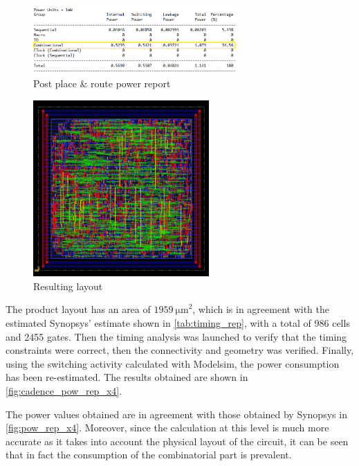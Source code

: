 \begin{figure}[htb]
	\center
	\includegraphics[width=0.7\textwidth]{images/rep_power_x4_cadence_mod.png}
	\caption{Post place \& route power report}
	\label{fig:cadence_pow_rep_x4}
\end{figure}

\begin{figure}[htb]
	\center
	\includegraphics[width=0.6\textwidth]{images/IIR_filter_period_min_x4_place.jpg}
	\caption{Resulting layout}
	\label{fig:layout}
\end{figure}

The product layout has an area of $\SI{1959}{\micro\meter}^2$, which is in agreement with the estimated Synopsys' estimate shown in \autoref{tab:timing_rep}, with a total of 986 cells and 2455 gates. Then the timing analysis was launched to verify that the timing constraints were correct, then the connectivity and geometry was verified. Finally, using the switching activity calculated with Modelsim, the power consumption has been re-estimated. The results obtained are shown in \autoref{fig:cadence_pow_rep_x4}.


The power values obtained are in agreement with those obtained by Synopsys in \autoref{fig:pow_rep_x4}. Moreover, since the calculation at this level is much more accurate as it takes into account the physical layout of the circuit, it can be seen that in fact the consumption of the combinatorial part is prevalent.

\pagebreak
